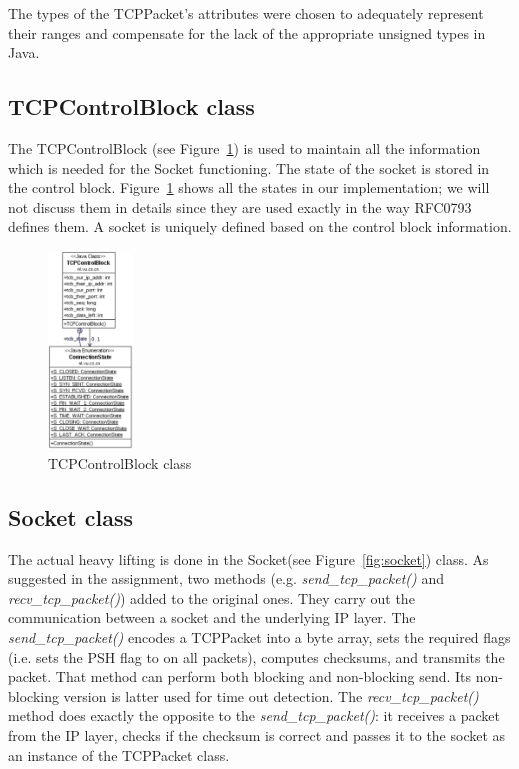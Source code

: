 \documentclass{article}
\begin{document}
\noindent
The types of the TCPPacket's attributes were chosen to adequately represent their ranges and compensate
for the lack of the appropriate unsigned types in Java.
  
\subsection{TCPControlBlock class}
The TCPControlBlock (see Figure~\ref{fig:tcb}) is used to maintain all the information which is needed
for the Socket functioning. The state of the socket is stored in the control block. Figure~\ref{fig:tcb}
shows all the states in our implementation; we will not discuss them in details since they are used
exactly in the way RFC0793 defines them. A socket is uniquely defined based on the control block information.


\begin{figure}[h!]
\centering
\includegraphics[width=0.2\textwidth]{images/control_block}
\caption{TCPControlBlock class}
\label{fig:tcb}
\end{figure}
  
\subsection{Socket class}
The actual heavy lifting is done in the Socket(see Figure~\ref{fig:socket}) class. As suggested in the assignment, two methods 
(e.g. \textit{send\_tcp\_packet()} and \textit{recv\_tcp\_packet()}) added to the original ones. They carry out the communication
between a socket and the underlying IP layer. The \textit{send\_tcp\_packet()} encodes a TCPPacket into a byte array,
sets the required flags (i.e. sets the PSH flag to on all packets), computes checksums, and transmits the
packet. That method can perform both blocking and non-blocking send. Its non-blocking version is latter 
used for time out detection. The \textit{recv\_tcp\_packet()} method does exactly the opposite to the \textit{send\_tcp\_packet()}:
it receives a packet from the IP layer, checks if the checksum is correct and passes it to the socket
as an instance of the TCPPacket class.
\end{document}
